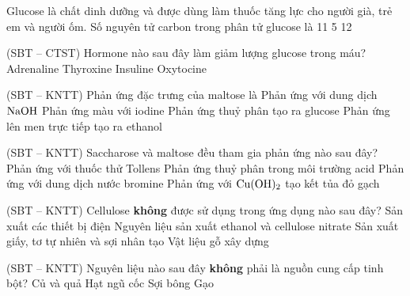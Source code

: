\documentclass[12pt,a4paper]{article}
\begin{document}
\begin{ex}
Glucose là chất dinh dưỡng và được dùng làm thuốc tăng lực cho người già, trẻ em và người ốm. Số nguyên tử carbon trong phân tử glucose là
\choice
{}
{11}
{5}
{12}
\end{ex}

\begin{ex}
(SBT -- CTST) Hormone nào sau đây làm giảm lượng glucose trong máu?
\choice
{Adrenaline}
{Thyroxine}
{\True Insuline}
{Oxytocine}
\end{ex}

\begin{ex}
(SBT -- KNTT) Phản ứng đặc trưng của maltose là
\choice
{Phản ứng với dung dịch $\ce{NaOH}$}
{Phản ứng màu với iodine}
{\True Phản ứng thuỷ phân tạo ra glucose}
{Phản ứng lên men trực tiếp tạo ra ethanol}
\end{ex}

\begin{ex}
(SBT -- KNTT) Saccharose và maltose đều tham gia phản ứng nào sau đây?
\choice
{Phản ứng với thuốc thử Tollens}
{\True Phản ứng thuỷ phân trong môi trường acid}
{Phản ứng với dung dịch nước bromine}
{Phản ứng với $\ce{Cu(OH)2}$ tạo kết tủa đỏ gạch}
\end{ex}

\begin{ex}
(SBT -- KNTT) Cellulose \textbf{không} được sử dụng trong ứng dụng nào sau đây?
\choice
{\True Sản xuất các thiết bị điện}
{Nguyên liệu sản xuất ethanol và cellulose nitrate}
{Sản xuất giấy, tơ tự nhiên và sợi nhân tạo}
{Vật liệu gỗ xây dựng}
\end{ex}

\begin{ex}
(SBT -- KNTT) Nguyên liệu nào sau đây \textbf{không} phải là nguồn cung cấp tinh bột?
\choice
{Củ và quả}
{Hạt ngũ cốc}
{\True Sợi bông}
{Gạo}
\end{ex}
\end{document}
